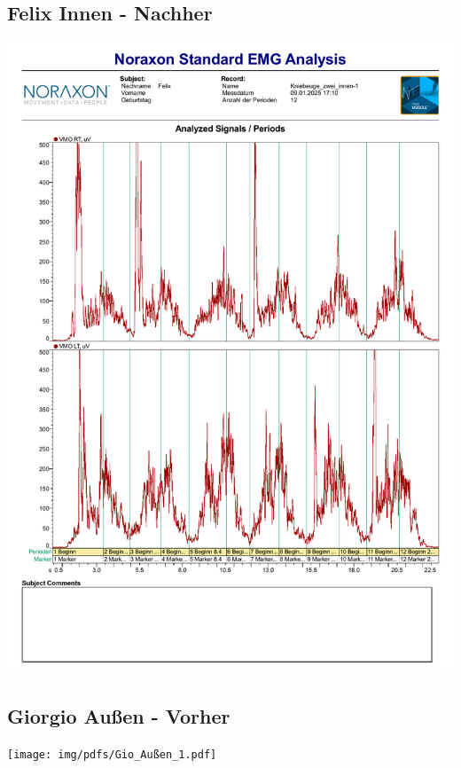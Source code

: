 \subsection*{Felix Innen - Nachher}
\includegraphics[width=.9\textwidth]{img/pdfs/Felix_2_innen.pdf}
\clearpage

\subsection*{Giorgio Außen - Vorher}
\texttt{[image: img/pdfs/Gio\_Außen\_1.pdf]}
\clearpage


